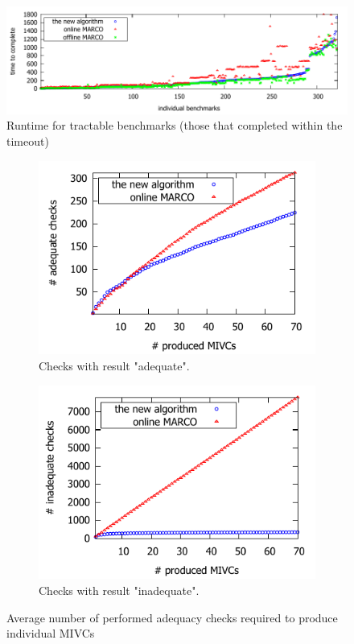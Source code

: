 \begin{figure}[!t]
\centering
\includegraphics[scale=0.8]{./plots/time_to_complete.pdf}
\caption{Runtime for tractable benchmarks (those that completed within the timeout)}
\label{res:time_to_complete}
\end{figure}

\begin{figure}[!t]
\centering
\begin{subfigure}{.5\textwidth}
  \centering
  \includegraphics[scale=0.8]{./plots/adequate_checks_per_mivc_70.pdf}
  \caption{Checks with result "adequate".}
  \label{res:adequate_checks}
\end{subfigure}%
\begin{subfigure}{.5\textwidth}
  \centering
  \includegraphics[scale=0.8]{./plots/inadequate_checks_per_mivc_70.pdf}
  \caption{Checks with result "inadequate".}
  \label{res:inadequate_checks}
\end{subfigure}
\caption{Average number of performed adequacy checks required to produce individual MIVCs}
\label{res:checks}
\end{figure}

